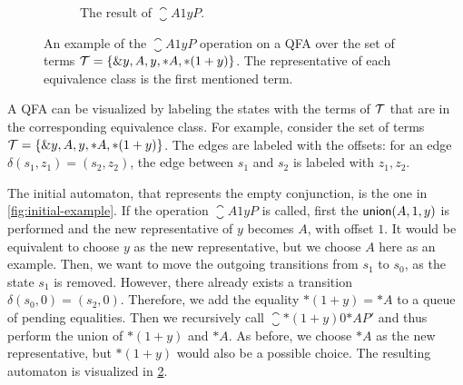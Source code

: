 \begin{figure}
\begin{subfigure}{0.5\textwidth}

    \caption{The result of $\closure{A}{1}{y}{P}$.}\label{fig:closure-example}
  \end{subfigure}

  \caption[Visualization of the $\closure{A}{1}{y}{P}$ operation]{An example of the $\closure{A}{1}{y}{P}$ operation on a QFA over the set of terms
    $\mathcal{T} = \{\&y, A, y, *A, *(1 + y)\}$.
    The representative of each equivalence class is the first mentioned term.}


\end{figure}

\begin{example}
  A QFA can be visualized by labeling the states with the terms of $\mathcal{T}$ that are in the corresponding equivalence class.
  For example, consider the set of terms $\mathcal{T} = \{\&y, A, y, *A, *(1 + y)\}$.
  The edges are labeled with the offsets: for an edge $\delta(s_1, z_1) = (s_2, z_2)$, the edge between $s_1$ and $s_2$ is labeled with $z_1, z_2$.

  The initial automaton, that represents the empty conjunction, is the one in \cref{fig:initial-example}.
  If the operation $\closure{A}{1}{y}{P}$ is called,
  first the $\textsf{union}(A, 1, y)$ is performed and the new representative of $y$ becomes $A$, with offset $1$.
  It would be equivalent to choose $y$ as the new representative, but we choose $A$ here as an example.
  Then, we want to move the outgoing transitions from $s_1$ to $s_0$, as the state $s_1$ is removed.
  However, there already exists a transition $\delta(s_0,0) = (s_2, 0)$.
  Therefore, we add the equality $*(1 + y) = *A$ to a queue of pending equalities.
  Then we recursively call $\closure{*(1 + y)}{0}{*A}{P'}$ and thus perform the union of $*(1 + y)$ and $*A$.
  As before, we choose $*A$ as the new representative, but $*(1+y)$ would also be a possible choice.
  The resulting automaton is visualized in \cref{fig:closure-example}.
\end{example}

